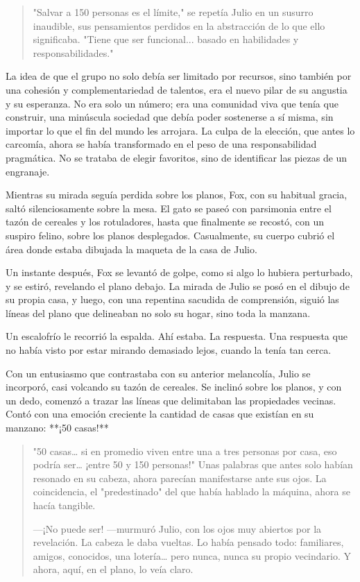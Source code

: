 \documentclass[a4paper,12pt]{book}
\begin{document}
\begin{quote}
    "Salvar a 150 personas es el límite," se repetía Julio en un susurro inaudible, sus pensamientos perdidos en la abstracción de lo que ello significaba. "Tiene que ser funcional... basado en habilidades y responsabilidades."
\end{quote}

La idea de que el grupo no solo debía ser limitado por recursos, sino también por una cohesión y complementariedad de talentos, era el nuevo pilar de su angustia y su esperanza. No era solo un número; era una comunidad viva que tenía que construir, una minúscula sociedad que debía poder sostenerse a sí misma, sin importar lo que el fin del mundo les arrojara. La culpa de la elección, que antes lo carcomía, ahora se había transformado en el peso de una responsabilidad pragmática. No se trataba de elegir favoritos, sino de identificar las piezas de un engranaje.

Mientras su mirada seguía perdida sobre los planos, Fox, con su habitual gracia, saltó silenciosamente sobre la mesa. El gato se paseó con parsimonia entre el tazón de cereales y los rotuladores, hasta que finalmente se recostó, con un suspiro felino, sobre los planos desplegados. Casualmente, su cuerpo cubrió el área donde estaba dibujada la maqueta de la casa de Julio.

Un instante después, Fox se levantó de golpe, como si algo lo hubiera perturbado, y se estiró, revelando el plano debajo. La mirada de Julio se posó en el dibujo de su propia casa, y luego, con una repentina sacudida de comprensión, siguió las líneas del plano que delineaban no solo su hogar, sino toda la manzana.

Un escalofrío le recorrió la espalda. Ahí estaba. La respuesta. Una respuesta que no había visto por estar mirando demasiado lejos, cuando la tenía tan cerca.

Con un entusiasmo que contrastaba con su anterior melancolía, Julio se incorporó, casi volcando su tazón de cereales. Se inclinó sobre los planos, y con un dedo, comenzó a trazar las líneas que delimitaban las propiedades vecinas. Contó con una emoción creciente la cantidad de casas que existían en su manzano: **¡50 casas!**

\begin{quote}
    "50 casas… si en promedio viven entre una a tres personas por casa, eso podría ser… ¡entre 50 y 150 personas!" Unas palabras que antes solo habían resonado en su cabeza, ahora parecían manifestarse ante sus ojos. La coincidencia, el "predestinado" del que había hablado la máquina, ahora se hacía tangible.

    —¡No puede ser! —murmuró Julio, con los ojos muy abiertos por la revelación. La cabeza le daba vueltas. Lo había pensado todo: familiares, amigos, conocidos, una lotería… pero nunca, nunca su propio vecindario. Y ahora, aquí, en el plano, lo veía claro.
\end{quote}
\end{document}
